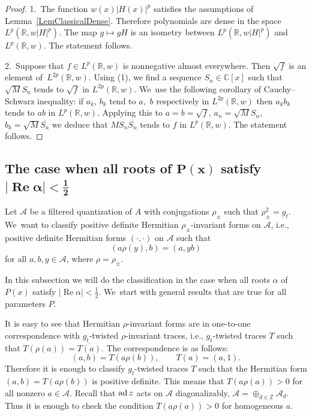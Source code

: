 \documentclass[pdftex]{sigma}
\newcommand{\RN}{\mathbb{R}} %
\newcommand{\CN}{\mathbb{C}} %
\newcommand{\ZN}{\mathbb{Z}} %
\newcommand{\ovl}{\overline}
\newcommand{\ad}{\ensuremath\operatorname{ad}}
\newcommand{\mc}[1]{\mathcal{#1}}
\renewcommand{\Re}{\operatorname{Re}}
\theoremstyle{definition}
\numberwithin{equation}{section}
\begin{document}
\begin{proof}
1.\ The function $w(x)|H(x)|^p$ satisfies the assumptions of Lemma~\ref{LemClassicalDense}. Therefore polynomials are dense in the space $L^p(\RN,w|H|^p)$. The map $g\mapsto gH$ is an isometry between $L^p(\RN,w|H|^p)$ and $L^p(\RN,w)$. The statement follows.

2.\ Suppose that $f\in L^p(\RN,w)$ is nonnegative almost everywhere. Then $\sqrt{f}$ is an element of~$L^{2p}(\RN,w)$. Using (1), we find a sequence $S_n\in \CN[x]$ such that $\sqrt{M}S_n$ tends to $\sqrt{f}$ in $L^{2p}(\RN,w)$. We~use the following corollary of Cauchy--Schwarz inequality: if $a_k$, $b_k$ tend to $a$,~$b$ respectively in $L^{2p}(\RN,w)$ then $a_kb_k$ tends to $ab$ in $L^p(\RN,w)$.
Applying this to $a=b=\sqrt{f}$, $a_n=\sqrt{M}S_n$, $b_k=\sqrt{M}\ovl{S_n}$ we deduce that $MS_n\ovl{S_n}$ tends to $f$ in $L^p(\RN,w)$. The statement follows.
\end{proof}

\subsection[The case when all roots of P(x) satisfy |Re alpha|<1/2]
{The case when all roots of $\boldsymbol{P(x)}$ satisfy $\boldsymbol{|\Re\alpha|<\frac{1}{2}}$}

Let $\mc A$ be a filtered quantization of $A$ with conjugations $\rho_\pm$ such that $\rho_\pm^2=g_t$. We~want to classify positive definite Hermitian $\rho_\pm$-invariant forms on $\mc{A}$, i.e., positive definite Hermitian forms $(\cdot,\cdot)$ on $\mc{A}$ such that
\[
(a\rho(y),b)=(a,yb)
\]
 for all $a,b,y\in\mc{A}$, where $\rho=\rho_\pm$.

In this subsection we will do the classification in the case when all roots $\alpha$ of $P(x)$ satisfy $|\Re\alpha|<\tfrac{1}{2}$. We~start with general results that are true for all parameters $P$.

 It is easy to see that Hermitian $\rho$-invariant forms are in one-to-one correspondence with $g_t$-twisted $\rho$-invariant traces, i.e., $g_t$-twisted traces $T$ such that $T(\rho(a))=\overline{T(a)}$. The correspondence is as follows:
 \[(a,b)=T(a\rho(b)),\qquad T(a)=(a,1).\] Therefore it is enough to classify $g_t$-twisted traces $T$ such that the Hermitian form $(a,b)=T(a\rho(b))$ is positive definite. This means that $T(a\rho(a))>0$ for all nonzero $a\in \mc{A}$. Recall that $\ad z$ acts on $\mc{A}$ diagonalizably, $\mc{A}=\oplus_{d\in \ZN} \mc{A}_{d}$. Thus it is enough to check the condition $T(a\rho(a))>0$ for homogeneous $a$.
\end{document}
